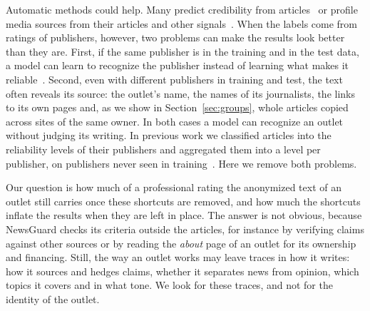 \documentclass[11pt,a4paper]{article}
\begin{document}
Automatic methods could help. Many predict credibility from articles~\cite{pandolfi2020automatic,Przybyla2021plugin,
10.1145/3770077,DBLP:journals/dbsk/AdjiLS26} or profile media sources from their articles and other
signals~\cite{baly2018predicting,baly2020written,nakov2024survey}. When the labels come from ratings of publishers,
however, two problems can make the results look better than they are. First, if the same publisher is in the training
and in the test data, a model can learn to recognize the publisher instead of learning what makes it
reliable~\cite{zhou2021hidden,azizov-etal-2024-safari,verhoeven2025yesterday}. Second, even with different publishers
in training and test, the text often reveals its source: the outlet's name, the names of its journalists, the links to
its own pages and, as we show in Section~\ref{sec:groups}, whole articles copied across sites of the same owner. In both
cases a model can recognize an outlet without judging its writing. In previous work we classified articles into the reliability levels of their publishers and aggregated them into a
level per publisher, on publishers never seen in training~\cite{Bianchi2024SAC,bianchi2026articles}. Here we remove both problems.

Our question is how much of a professional rating the anonymized text of an outlet still carries once these
shortcuts are removed, and how much the shortcuts inflate the results when they are left in place. The answer is not
obvious, because NewsGuard checks its criteria outside the articles, for instance by verifying claims against other
sources or by reading the \emph{about} page of an outlet for its ownership and financing. Still, the way an outlet works
may leave traces in how it writes: how it sources and hedges claims, whether it separates news from opinion, which
topics it covers and in what tone. We look for these traces, and not for the identity of the outlet.
\end{document}
